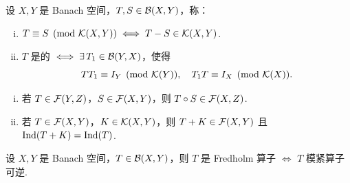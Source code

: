 \begin{definition}[模紧算子等价]
设 $X,Y$ 是 Banach 空间，$T,S \in \mathcal{B}(X,Y)$，称：
\begin{enumerate}[(i)]
    \item $T \equiv S \pmod{\mathcal{K}(X,Y)} \iff T-S \in \mathcal{K}(X,Y)$.
    \item $T$ 是的 $\iff \exists\, T_1 \in \mathcal{B}(Y,X)$，使得
    \begin{equation*}
    TT_1 \equiv I_Y \pmod{\mathcal{K}(Y)},\quad T_1T \equiv I_X \pmod{\mathcal{K}(X)}.
    \end{equation*}
\end{enumerate}
\end{definition}

\begin{lemma}\label{lem:fredholm-composition}
\begin{enumerate}[(i)]
    \item 若 $T \in \mathcal{F}(Y,Z)$，$S \in \mathcal{F}(X,Y)$，则 $T \circ S \in \mathcal{F}(X,Z)$.
    \item 若 $T \in \mathcal{F}(X,Y)$，$K \in \mathcal{K}(X,Y)$，则 $T+K \in \mathcal{F}(X,Y)$ 且 $\operatorname{Ind}(T+K) = \operatorname{Ind}(T)$.
\end{enumerate}
\end{lemma}

\begin{theorem}\label{thm:fredholm-mod-compact}
设 $X,Y$ 是 Banach 空间，$T \in \mathcal{B}(X,Y)$，则 $T$ 是 Fredholm 算子 $\iff$ $T$ 模紧算子可逆.
\end{theorem}

